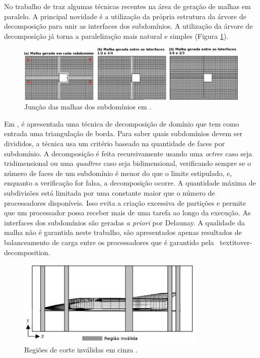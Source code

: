     No trabalho de \cite{bib:LOHNER14} traz algumas técnicas recentes na área de geração de malhas em paralelo. A principal novidade é a utilização da própria estrutura da árvore de decomposição para unir as interfaces dos subdomínios. A utilização da árvore de decomposição já torna a paralelização mais natural e simples (Figura \ref{fig:lohner14}).
    
    
    \begin{figure}[htbp]
    	\centering
    	\includegraphics[width=1.0\textwidth]{fig/lohner14.png}
    	\caption{Junção das malhas dos subdomínios em \cite{bib:LOHNER14}.}
    	\label{fig:lohner14}
    \end{figure}
    
    
    Em \cite{bib:Larwood03}, é apresentada uma técnica de decomposição de domínio que tem como entrada uma triangulação de borda. Para saber quais subdomínios devem ser divididos, a técnica usa um critério baseado na quantidade de faces por subdomínio. A decomposição é feita recursivamente usando uma \textit{octree} caso seja tridimensional ou uma \textit{quadtree} caso seja bidimensional, verificando sempre se o número de faces de um subdomínio é menor do que o limite estipulado, e, enquanto a verificação for falsa, a decomposição ocorre. A quantidade máxima de subdivisões está limitada por uma constante maior que o número de processadores disponíveis. Isso evita a criação excessiva de partições e permite que um processador possa receber mais de uma tarefa ao longo da execução. As interfaces dos subdomínios são geradas \textit{a priori} por Delaunay. A qualidade da malha não é garantida neste trabalho, são apresentados apenas resultados de balanceamento de carga entre os processadores que é garantido pela \
    textit{over-decomposition}.
    
    \begin{figure}[htbp]
    	\centering
    	\includegraphics[width=0.8\textwidth]{fig/larwood03.jpg}
    	\caption{Regiões de corte inválidas em cinza \cite{bib:Larwood03}.}
    	\label{fig:larwood03}
    \end{figure}
    
